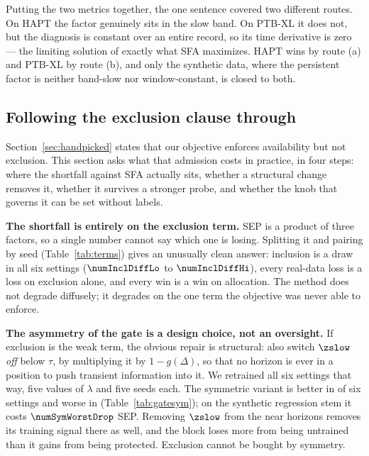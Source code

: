 Putting the two metrics together, the one sentence covered two different routes. On HAPT the factor genuinely sits in the slow band. On PTB-XL it does not, but the diagnosis is constant over an entire record, so its time derivative is zero --- the limiting solution of exactly what SFA maximizes. HAPT wins by route (a) and PTB-XL by route (b), and only the synthetic data, where the persistent factor is neither band-slow nor window-constant, is closed to both.

\subsection{Following the exclusion clause through}
\label{sec:exclusion}

Section~\ref{sec:handpicked} states that our objective enforces availability but not exclusion. This section asks what that admission costs in practice, in four steps: where the shortfall against SFA actually sits, whether a structural change removes it, whether it survives a stronger probe, and whether the knob that governs it can be set without labels.

\textbf{The shortfall is entirely on the exclusion term.} SEP is a product of three factors, so a single number cannot say which one is losing. Splitting it and pairing by seed (Table~\ref{tab:terms}) gives an unusually clean answer: inclusion is a draw in all six settings ($\numInclDiffLo$ to $\numInclDiffHi$), every real-data loss is a loss on exclusion alone, and every win is a win on allocation. The method does not degrade diffusely; it degrades on the one term the objective was never able to enforce.



\textbf{The asymmetry of the gate is a design choice, not an oversight.} If exclusion is the weak term, the obvious repair is structural: also switch $\zslow$ \emph{off} below $\tau$, by multiplying it by $1-g(\Delta)$, so that no horizon is ever in a position to push transient information into it. We retrained all six settings that way, five values of $\lambda$ and five seeds each. The symmetric variant is better in \numSymBetter{} of six settings and worse in \numSymWorse{} (Table~\ref{tab:gatesym}); on the synthetic regression stem it costs $\numSymWorstDrop$ SEP. Removing $\zslow$ from the near horizons removes its training signal there as well, and the block loses more from being untrained than it gains from being protected. Exclusion cannot be bought by symmetry.

